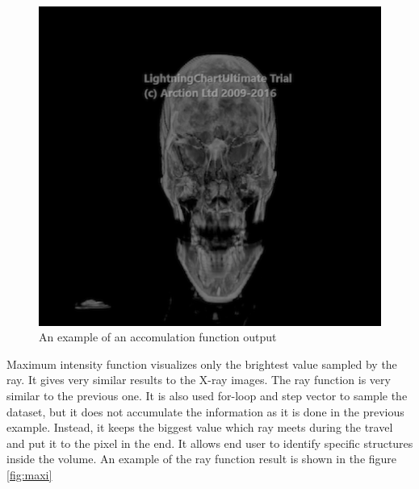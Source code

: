 \documentclass[twoside, english, 11pt]{report}
\begin{document}
\begin{figure}[!h]
\centerline{\includegraphics[scale = 0.6]{img/accum}}
\caption{An example of an accomulation function output\label{fig:accum}}
\end{figure}

Maximum intensity function visualizes only the brightest value sampled by the ray. It gives very similar results to the X-ray images. The ray function is very similar to the previous one. It is also used for-loop and step vector to sample the dataset, but it does not accumulate the information as it is done in the previous example. Instead, it keeps the biggest value which ray meets during the travel and put it to the pixel in the end. It allows end user to identify specific structures inside the volume. An example of the ray function result is shown in the figure \ref{fig:maxi}
\end{document}
